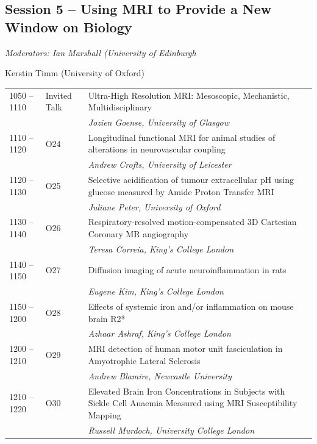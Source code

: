 \documentclass[a5paper,10pt,twoside,onecolumn,openany,helvetica,showtrims]{memoir}
\newlength{\JackBoxOne}
\newlength{\JackBoxTwo}
\newlength{\JackBoxThree}
\newcommand{\talkauthor}[1]{\small\emph{#1}}
\begin{document}
\subsection*{Session 5 -- Using MRI to Provide a New Window on Biology}
\begin{flushright}
\itshape Moderators: Ian Marshall (University of Edinburgh 

Kerstin Timm (University of Oxford)
\end{flushright}
\noindent\hspace{-0.75em}\begin{longtable}{p{\JackBoxOne}p{\JackBoxTwo}p{\JackBoxThree}}
1050 -- 1110 & Invited Talk & Ultra-High Resolution MRI: Mesoscopic, Mechanistic, Multidisciplinary \\ 
& & \talkauthor{Jozien Goense, University of Glasgow}\\
1110 -- 1120 & O24 & Longitudinal functional MRI for animal studies of alterations in neurovascular coupling \\
& & \talkauthor{Andrew Crofts, University of Leicester}\\
1120 -- 1130 & O25 & Selective acidification of tumour extracellular pH using glucose measured by Amide Proton Transfer MRI  \\
& & \talkauthor{Juliane Peter, University of Oxford}\\
1130 -- 1140 & O26 & Respiratory-resolved motion-compensated 3D Cartesian Coronary MR angiography  \\
& & \talkauthor{Teresa Correia, King's College London}\\
1140 -- 1150 & O27 & Diffusion imaging of acute neuroinflammation in rats  \\
& & \talkauthor{Eugene Kim, King's College London}\\
1150 -- 1200 & O28 & Effects of systemic iron and/or inflammation on mouse brain R2*  \\
& & \talkauthor{Azhaar Ashraf, King's College London}\\
1200 -- 1210 & O29 & MRI detection of human motor unit fasciculation in Amyotrophic Lateral Sclerosis  \\
& & \talkauthor{Andrew Blamire, Newcastle University}\\
1210 -- 1220 & O30 & Elevated Brain Iron Concentrations in Subjects with Sickle Cell Anaemia Measured using MRI Susceptibility Mapping  \\
& & \talkauthor{Russell Murdoch, University College London}\\

\end{longtable}
\end{document}
